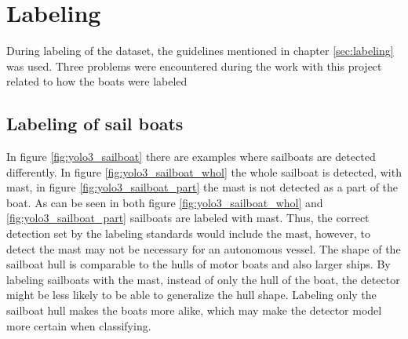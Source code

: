 \newpage

\section{Labeling}

During labeling of the dataset, the guidelines mentioned in chapter \ref{sec:labeling} was used. Three problems were encountered during the work with this project related to how the boats were labeled

\subsection{Labeling of sail boats}

In figure \ref{fig:yolo3_sailboat} there are examples where sailboats are detected differently. In figure \ref{fig:yolo3_sailboat_whol} the whole sailboat is detected, with mast, in figure \ref{fig:yolo3_sailboat_part} the mast is not detected as a part of the boat. As can be seen in both figure \ref{fig:yolo3_sailboat_whol} and \ref{fig:yolo3_sailboat_part} sailboats are labeled with mast. Thus, the correct detection set by the labeling standards would include the mast, however, to detect the mast may not be necessary for an autonomous vessel. The shape of the sailboat hull is comparable to the hulls of motor boats and also larger ships. By labeling sailboats with the mast, instead of only the hull of the boat, the detector might be less likely to be able to generalize the hull shape. Labeling only the sailboat hull makes the boats more alike, which may make the detector model more certain when classifying. 



